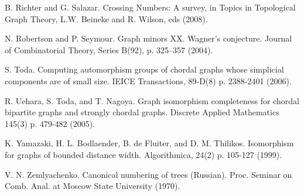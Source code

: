 \documentclass[11pt]{report}
\begin{document}
\begin{thebibliography}{9}
B. Richter and G. Salazar. Crossing Numbers: A survey, in Topics in Topological Graph Theory, L.W. Beineke and R. Wilson, eds (2008).

N. Robertson and P. Seymour. Graph minors XX. Wagner’s conjecture. Journal of Combinatorial Theory, Series B(92), p. 325–357 (2004).

S. Toda. Computing automorphism groups of chordal graphs whose simplicial components are of small size. IEICE Transactions, 89-D(8) p. 2388-2401 (2006).

 R. Uehara, S. Toda, and T. Nagoya. Graph isomorphism completeness for chordal bipartite graphs and strongly chordal graphs. Discrete Applied Mathematics 145(3) p. 479-482 (2005).

K. Yamazaki, H. L. Bodlaender, B. de Fluiter, and D. M. Thilikos. Isomorphism for graphs of bounded distance width. Algorithmica, 24(2) p. 105-127 (1999).

V. N. Zemlyachenko. Canonical numbering of trees (Russian). Proc. Seminar on Comb. Anal. at Moscow State University (1970).

\end{thebibliography}
\end{document}

